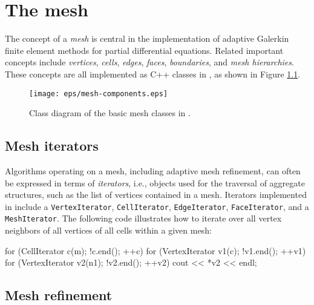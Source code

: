 \chapter{The mesh}



The concept of a \emph{mesh} is central in the implementation of
adaptive Galerkin finite element methods for partial differential equations.
Related important concepts include \emph{vertices}, \emph{cells},
\emph{edges}, \emph{faces}, \emph{boundaries}, and \emph{mesh hierarchies}. These 
concepts are all implemented as C++ classes in \dolfin{}, as shown in Figure \ref{fig:meshclasses}.

\begin{figure}[htbp]
  \begin{center}
    \texttt{[image: eps/mesh-components.eps]}
    \caption{Class diagram of the basic mesh classes in \dolfin{}.}
    \label{fig:meshclasses}
  \end{center}
\end{figure}

\section{Mesh iterators}

Algorithms operating on a mesh, including adaptive mesh refinement,
can often be expressed in terms of
\emph{iterators}, i.e., objects used for the traversal of aggregate
structures, such as the list of vertices contained in a mesh. Iterators
implemented in \dolfin{} include a \texttt{VertexIterator},
\texttt{CellIterator}, \texttt{Edge}\-\texttt{Iterator}, \texttt{FaceIterator},
and a \texttt{MeshIterator}. The following code illustrates how to
iterate over all vertex neighbors of all vertices of all cells within a
given mesh:
\begin{code}
  for (CellIterator c(m); !c.end(); ++c)
    for (VertexIterator v1(c); !v1.end(); ++v1)
      for (VertexIterator v2(n1); !v2.end(); ++v2)
        cout << *v2 << endl;
\end{code}

\section{Mesh refinement}

